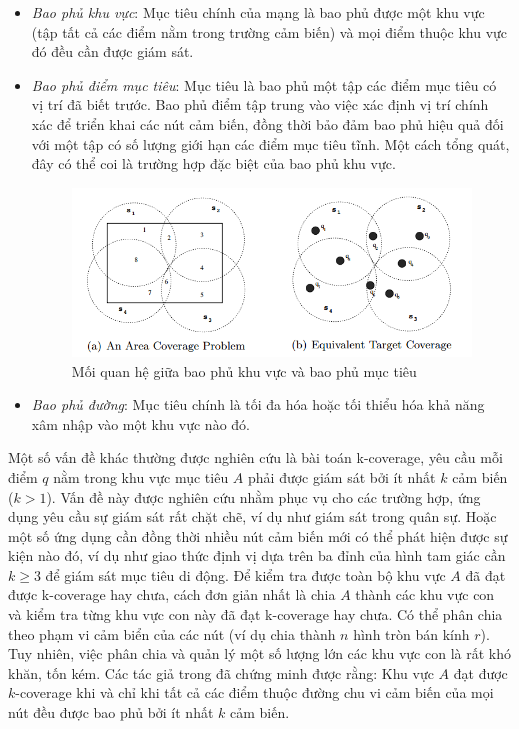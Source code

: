 \documentclass{article}
\begin{document}
\begin{itemize}
\item \emph{Bao phủ khu vực}: Mục tiêu chính của mạng là bao phủ được một khu vực (tập tất cả các điểm nằm trong trường cảm biến) và mọi điểm thuộc khu vực đó đều cần được giám sát.
\item  \emph{Bao phủ điểm mục tiêu}: Mục tiêu là bao phủ một tập các điểm mục tiêu có vị trí đã biết trước. Bao phủ điểm tập trung vào việc xác định vị trí chính xác để triển khai các nút cảm biến, đồng thời bảo đảm bao phủ hiệu quả đối với một tập có số lượng giới hạn các điểm mục tiêu tĩnh. Một cách tổng quát, đây có thể coi là trường hợp đặc biệt của bao phủ khu vực.
\begin{figure}[ht]
\includegraphics[width=\textwidth]{images/coverage.png}
\caption{Mối quan hệ giữa bao phủ khu vực và bao phủ mục tiêu \cite{thai2008coverage}}
\end{figure}
\item  \emph{Bao phủ đường}: Mục tiêu chính là tối đa hóa hoặc tối thiểu hóa khả năng xâm nhập vào một khu vực nào đó.
\end{itemize}
Một số vấn đề khác thường được nghiên cứu là bài toán k-coverage, yêu cầu mỗi điểm $q$ nằm trong khu vực mục tiêu $A$ phải được giám sát bởi ít nhất $k$ cảm biến ($k > 1$). Vấn đề này được nghiên cứu nhằm phục vụ cho các trường hợp, ứng dụng yêu cầu sự giám sát rất chặt chẽ, ví dụ như giám sát trong quân sự. Hoặc một số ứng dụng cần đồng thời nhiều nút cảm biến mới có thể phát hiện được sự kiện nào đó, ví dụ như giao thức định vị dựa trên ba đỉnh của hình tam giác cần $k \geq 3$ để giám sát mục tiêu di động.  Để kiểm tra được toàn bộ khu vực $A$ đã đạt được k-coverage hay chưa, cách đơn giản nhất là chia $A$ thành các khu vực con và kiểm tra từng khu vực con này đã đạt k-coverage hay chưa. Có thể phân chia theo phạm vi cảm biển của các nút (ví dụ chia thành $n$ hình tròn bán kính $r$). Tuy nhiên, việc phân chia và quản lý một số lượng lớn các khu vực con là rất khó khăn, tốn kém. Các tác giả trong \cite{huang2005coverage} đã chứng minh được rằng: Khu vực $A$ đạt được$k$-coverage khi và chỉ khi tất cả các điểm thuộc đường chu vi cảm biến của mọi nút  đều được bao phủ bởi ít nhất $k$ cảm biến.
\end{document}
